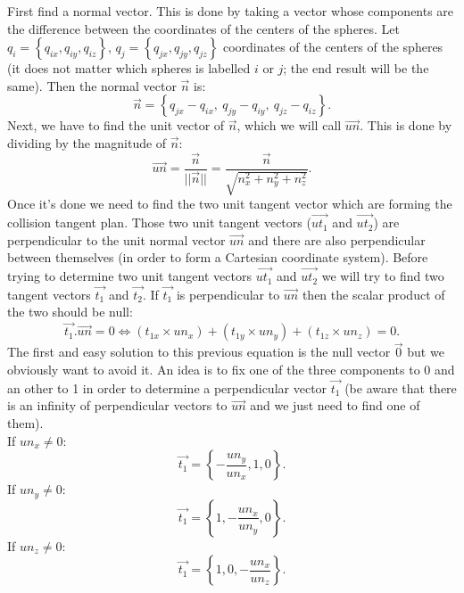 First find a normal vector.
This is done by taking a vector whose components are the difference between the coordinates of the centers of the spheres. 
Let $q_i = \left\{q_{ix}, q_{iy}, q_{iz}\right\}$, $q_j = \left\{q_{jx}, q_{jy}, q_{jz}\right\}$ coordinates of the centers of the spheres (it does not matter which spheres is labelled $i$ or $j$; the end result will be the same).
Then the normal vector $\vec{n}$ is: 
\begin{equation*}	
	\vec{n} = \left\{ q_{jx} - q_{ix},~q_{jy} - q_{iy},~q_{jz} - q_{iz}  \right\}.
\end{equation*}
Next, we have to find the unit vector of $\vec{n}$, which we will call $\vec{un}$. This is done by dividing by the magnitude of $\vec{n}$:
\begin{equation*}	
	\vec{un} = \frac{\vec{n}}{||\vec{n}||} = \frac{\vec{n}}{\sqrt{n_x^2 + n_y^2 + n_z^2}}.
\end{equation*}
Once it's done we need to find the two unit tangent vector which are forming the collision tangent plan.
Those two unit tangent vectors ($\vec{ut_1}$ and $\vec{ut_2}$) are perpendicular to the unit normal vector $\vec{un}$ and there are also perpendicular between themselves (in order to form a Cartesian coordinate system).
Before trying to determine two unit tangent vectors $\vec{ut_1}$ and $\vec{ut_2}$ we will try to find two tangent vectors $\vec{t_1}$ and $\vec{t_2}$.
If $\vec{t_1}$ is perpendicular to $\vec{un}$ then the scalar product of the two should be null:
\begin{equation*}
	\vec{t_1} . \vec{un} = 0 \Leftrightarrow	(t_{1x} \times un_x) + (t_{1y} \times un_y) + (t_{1z} \times un_z) = 0.
\end{equation*}
The first and easy solution to this previous equation is the null vector $\vec{0}$ but we obviously want to avoid it.
An idea is to fix one of the three components to 0 and an other to 1 in order to determine a perpendicular vector $\vec{t_1}$ (be aware that there is an infinity of perpendicular vectors to $\vec{un}$ and we just need to find one of them).\\
If $un_x \neq 0$:
\begin{equation*}
	\vec{t_1} = \left\{ -\frac{un_y}{un_x}, 1, 0 \right\}.
\end{equation*}
If $un_y \neq 0$:
\begin{equation*}
	\vec{t_1} = \left\{ 1, -\frac{un_x}{un_y}, 0 \right\}.
\end{equation*}
If $un_z \neq 0$:
\begin{equation*}
	\vec{t_1} = \left\{ 1, 0, -\frac{un_x}{un_z} \right\}.
\end{equation*}
